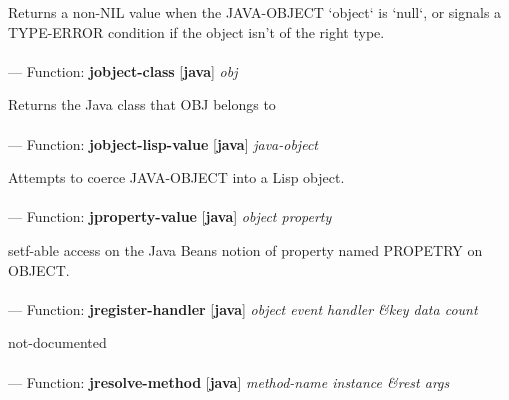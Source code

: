 \begin{adjustwidth}{5em}{5em}
Returns a non-NIL value when the JAVA-OBJECT `object` is `null`,
or signals a TYPE-ERROR condition if the object isn't of
the right type.
\end{adjustwidth}

\paragraph{}
\label{JAVA:JOBJECT-CLASS}
--- Function: \textbf{jobject-class} [\textbf{java}] \textit{obj}

\begin{adjustwidth}{5em}{5em}
Returns the Java class that OBJ belongs to
\end{adjustwidth}

\paragraph{}
\label{JAVA:JOBJECT-LISP-VALUE}
--- Function: \textbf{jobject-lisp-value} [\textbf{java}] \textit{java-object}

\begin{adjustwidth}{5em}{5em}
Attempts to coerce JAVA-OBJECT into a Lisp object.
\end{adjustwidth}

\paragraph{}
\label{JAVA:JPROPERTY-VALUE}
--- Function: \textbf{jproperty-value} [\textbf{java}] \textit{object property}

\begin{adjustwidth}{5em}{5em}
setf-able access on the Java Beans notion of property named PROPETRY on OBJECT.
\end{adjustwidth}

\paragraph{}
\label{JAVA:JREGISTER-HANDLER}
--- Function: \textbf{jregister-handler} [\textbf{java}] \textit{object event handler \&key data count}

\begin{adjustwidth}{5em}{5em}
not-documented
\end{adjustwidth}

\paragraph{}
\label{JAVA:JRESOLVE-METHOD}
--- Function: \textbf{jresolve-method} [\textbf{java}] \textit{method-name instance \&rest args}

